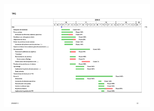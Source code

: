 \begin{figure}[H]
\centering
\includegraphics[width=0.7\textwidth]{Chapters/Chapter3/Figures/tfg-gantt-mar}
\end{figure}

